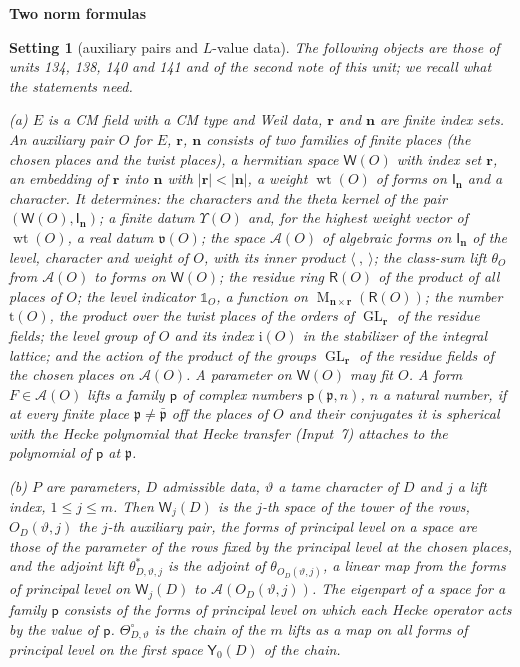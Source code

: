 \documentclass[11pt,a4paper]{article}
\newcommand{\kw}[1]{\emph{#1}}
\newcommand{\sect}[2]{\refstepcounter{section}\label{#2}\par\addvspace{19pt plus 4pt minus 2pt}\Needspace{7\baselineskip}%
  \noindent\llap{{\fontsize{13.2}{16}\selectfont\bfseries\color{inkfaint}\thesection}\hspace{9pt}}%
  {\fontsize{13.2}{16}\selectfont\bfseries\color{ink}#1}\par\nopagebreak\vspace{-1pt}}
\theoremstyle{plainx}
\theoremstyle{uprightx}
\newtheorem{setting}[theorem]{Setting}          %
\newcommand{\sR}{\mathsf{R}}
\newcommand{\bn}{\mathbf{n}}
\newcommand{\br}{\mathbf{r}}
\newcommand{\sW}{\mathsf{W}}
\newcommand{\sY}{\mathsf{Y}}
\newcommand{\sI}{\mathsf{I}}
\newcommand{\fp}{\mathfrak{p}}
\newcommand{\fv}{\mathfrak{v}}
\newcommand{\fa}{O}
\newcommand{\GL}{\operatorname{GL}}
\newcommand{\Mat}[2]{\operatorname{M}_{#1\times#2}}
\begin{document}
\sect{Two norm formulas}{s:norms}
\begin{setting}[auxiliary pairs and $L$-value data]\label{set:aux}
The following objects are those of units 134, 138, 140 and 141 and of the second note of this unit; we recall
what the statements need.

\textup{(a)} $E$ is a CM field with a CM type and Weil data, $\br$ and $\bn$ are finite index sets. An
\kw{auxiliary pair} $\fa$ for $E$, $\br$, $\bn$ consists of two families of finite places (the chosen places and
the twist places), a hermitian space $\sW(\fa)$ with index set $\br$, an embedding of $\br$ into $\bn$ with
$|\br|<|\bn|$, a weight $\operatorname{wt}(\fa)$ of forms on $\sI_{\bn}$ and a character. It determines: the characters and
the theta kernel of the pair $(\sW(\fa),\sI_{\bn})$; a finite datum $\Upsilon(\fa)$ and, for the highest weight
vector of $\operatorname{wt}(\fa)$, a real datum $\fv(\fa)$; the space $\mathcal{A}(\fa)$ of algebraic forms on $\sI_{\bn}$ of
the level, character and weight of $\fa$, with its inner product $\langle\ ,\ \rangle$; the class-sum lift
$\theta_{\fa}$ from $\mathcal{A}(\fa)$ to forms on $\sW(\fa)$; the residue ring $\sR(\fa)$ of the product of all
places of $\fa$; the level indicator $\mathbb{1}_{\fa}$, a function on $\Mat{\bn}{\br}(\sR(\fa))$; the number
$\mathrm{t}(\fa)$, the product over the twist places of the orders of $\GL_{\br}$ of the residue fields; the level
group of $\fa$ and its index $\mathrm{i}(\fa)$ in the stabilizer of the integral lattice; and the action of the
product of the groups $\GL_{\br}$ of the residue fields of the chosen places on $\mathcal{A}(\fa)$. A parameter
on $\sW(\fa)$ may \kw{fit} $\fa$. A form $F\in\mathcal{A}(\fa)$ \kw{lifts} a family $\mathsf{p}$ of complex
numbers $\mathsf{p}(\fp,n)$, $n$ a natural number, if at every finite place $\fp\ne\bar{\fp}$ off the places of $\fa$ and their conjugates
it is spherical with the Hecke polynomial that Hecke transfer (Input~7) attaches to the polynomial of
$\mathsf{p}$ at $\fp$.

\textup{(b)} $P$ are parameters, $D$ admissible data, $\vartheta$ a tame character of $D$ and $j$ a lift index,
$1\le j\le m$. Then $\sW_{j}(D)$ is the $j$-th space of the tower of the rows, $\fa_D(\vartheta,j)$ the $j$-th
auxiliary pair, the \kw{forms of principal level} on a space are those of the parameter of the rows fixed by the
principal level at the chosen places, and the \kw{adjoint lift} $\theta^{*}_{D,\vartheta,j}$ is the adjoint of
$\theta_{\fa_D(\vartheta,j)}$, a linear map from the forms of principal level on $\sW_{j}(D)$ to
$\mathcal{A}(\fa_D(\vartheta,j))$. The \kw{eigenpart} of a space for a family $\mathsf{p}$ consists of the forms
of principal level on which each Hecke operator acts by the value of $\mathsf{p}$. $\Theta^{\circ}_{D,\vartheta}$
is the chain of the $m$ lifts as a map on all forms of principal level on the first space $\sY_0(D)$ of the
chain.


\end{setting}
\end{document}
